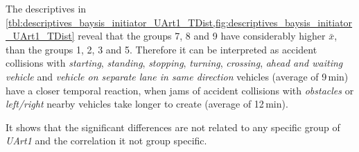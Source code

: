 The descriptives in \cref{tbl:descriptives_baysis_initiator_UArt1_TDist,fig:descriptives_baysis_initiator_UArt1_TDist} reveal that the groups 7, 8 and 9 have considerably higher $\bar{x}$, than the groups 1, 2, 3 and 5. Therefore it can be interpreted as accident collisions with \textit{starting}, \textit{standing}, \textit{stopping}, \textit{turning}, \textit{crossing}, \textit{ahead and waiting vehicle} and \textit{vehicle on separate lane in same direction} vehicles (average of 9\,min) have a closer temporal reaction, when jams of accident collisions with \textit{obstacles} or \textit{left/right} nearby vehicles take longer to create (average of 12\,min).

It shows that the significant differences are not related to any specific group of \textit{UArt1} and the correlation it not group specific.
